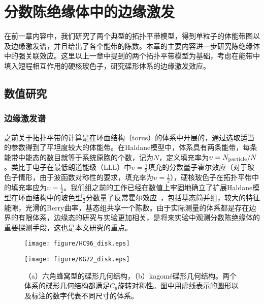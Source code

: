 \chapter{分数陈绝缘体中的边缘激发}
\label{sec:FCIedge}

在前一章内容中，我们研究了两个典型的拓扑平带模型，得到单粒子的体能带图以及边缘激发谱，并且给出了各个能带的陈数。本章的主要内容进一步研究陈绝缘体中的强关联效应。这里以上一章中提到的两个拓扑平带模型为基础，考虑在能带中填入短程相互作用的硬核玻色子，研究碟形体系的边缘激发效应。

\section{数值研究}
\subsection{边缘激发谱}
之前关于拓扑平带的计算是在环面结构（torus）的体系中开展的，通过选取适当的参数得到了平坦度较大的体能带。在Haldane模型中，体系具有两条能带，每条能带中能态的数目就等于系统原胞的个数，记为$N$，定义填充率为$\upsilon=N_{\rm particle}/N$。类比于电子在最低朗道能级（LLL）中$\upsilon=\frac{1}{3}$填充的分数量子霍尔效应（对于玻色子情形，由于波函数对称性的要求，填充率为$\upsilon=\frac{1}{2}$），硬核玻色子在拓扑平带中的填充率应为$\upsilon=\frac{1}{2}$。我们组之前的工作已经在数值上牢固地确立了扩展Haldane模型在环面结构中的玻色型$\frac{1}{2}$分数量子反常霍尔效应~\cite{Wang2011}，包括基态简并组，较大的特征能隙，光滑的Berry曲率，基态组共享一个陈数。由于实际测量的体系都是存在边界的有限体系，边缘态的研究与实验更加相关，是将来实验中观测分数陈绝缘体的重要探测手段，这也是本文研究的重点。

\begin{figure}[!tb]
  \centering
  \begin{minipage}[c]{0.45\textwidth}
  \texttt{[image: figure/HC96\_disk.eps]}
\end{minipage}
\hfill
  \begin{minipage}[c]{0.45\textwidth}
  \texttt{[image: figure/KG72\_disk.eps]}
\end{minipage}
  \caption{（a）六角蜂窝型的碟形几何结构，（b）kagom\'{e}碟形几何结构。两个体系的碟形几何结构都满足$C_6$旋转对称性。图中用虚线表示的圆形以及标注的数字代表不同尺寸的体系。}
\label{fig:disk}
\end{figure}

